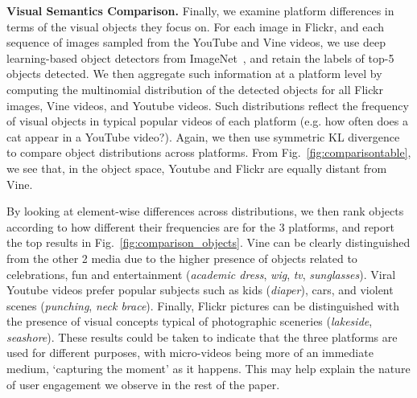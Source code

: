 \noindent\textbf{Visual Semantics Comparison.} 
Finally, we examine platform differences in terms of the visual objects they focus on.  For each image in Flickr, and each sequence of images sampled from the YouTube and Vine videos, we use deep learning-based object detectors from ImageNet~\cite{krizhevsky2012imagenet}, and retain the labels of top-5 objects detected. We then aggregate such information at a platform level by computing the multinomial distribution of the detected objects for all Flickr images, Vine videos, and Youtube videos.  Such distributions reflect  the frequency of visual objects in typical popular videos of each platform (e.g. how often does a cat appear in a YouTube video?). Again, we then use symmetric KL divergence to compare object distributions across platforms. From Fig.~\ref{fig:comparisontable}, we see that, in the object space, Youtube and Flickr are equally distant from Vine. 

By looking at element-wise differences across distributions, we then rank objects according to how different their frequencies are for the 3 platforms, and report the top results in Fig.~\ref{fig:comparison_objects}. Vine can be clearly distinguished from the other 2 media due to the higher presence of objects related to celebrations, fun and entertainment (\emph{academic dress}, \emph{wig}, \emph{tv}, \emph{sunglasses}). Viral Youtube videos prefer popular subjects such as kids (\emph{diaper}), cars, and  violent scenes (\emph{punching}, \emph{neck brace}). Finally, Flickr pictures can be distinguished with the presence of visual concepts typical of photographic sceneries (\emph{lakeside}, \emph{seashore}). These results could be taken to indicate that the three platforms are used for different purposes, with micro-videos being more of an immediate medium, `capturing the moment' as it happens. This may help explain the nature of user engagement we observe in the rest of the paper.
%



